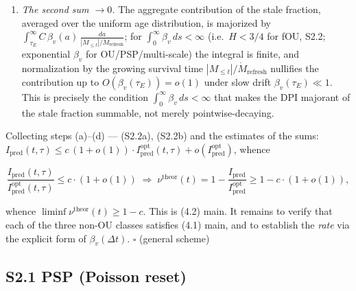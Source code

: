 \documentclass[12pt]{iopart}
\providecommand{\tightlist}{\setlength{\itemsep}{0pt}\setlength{\parskip}{0pt}}
\begin{document}
\begin{enumerate}

\def\labelenumi{(\alph{enumi})}

\setcounter{enumi}{3}

\tightlist

\item

  \emph{The second sum \(\to 0\).} The aggregate contribution of the stale fraction, averaged over the uniform age distribution, is majorized by \(\int_{\tau_E}^\infty C\,\beta_v(a)\,\frac{da}{|M_{\le t}|/\dot M_{\text{refresh}}}\); for \(\int_0^\infty\beta_v\,ds < \infty\) (i.e.~\(H < 3/4\) for fOU, S2.2; exponential \(\beta_v\) for OU/PSP/multi-scale) the integral is finite, and normalization by the growing survival time \(|M_{\le t}|/\dot M_{\text{refresh}}\) nullifies the contribution up to \(O(\beta_v(\tau_E)) = o(1)\) under slow drift \(\beta_v(\tau_E) \ll 1\). This is precisely the condition \(\int_0^\infty\beta_v\,ds < \infty\) that makes the DPI majorant of the stale fraction summable, not merely pointwise-decaying.

\end{enumerate}



Collecting steps (a)--(d) --- (S2.2a), (S2.2b) and the estimates of the sums: \(I_{\text{pred}}(t,\tau) \le c\,(1+o(1))\cdot I_{\text{pred}}^{\text{opt}}(t,\tau) + o(I_{\text{pred}}^{\text{opt}})\), whence



\[\frac{I_{\text{pred}}(t,\tau)}{I_{\text{pred}}^{\text{opt}}(t,\tau)} \le c\cdot(1+o(1)) \;\Longrightarrow\; \nu^{\text{theor}}(t) = 1 - \frac{I_{\text{pred}}}{I_{\text{pred}}^{\text{opt}}} \ge 1 - c\cdot(1+o(1)),\]



whence \(\liminf\nu^{\text{theor}}(t) \ge 1-c\). This is (4.2) main. It remains to verify that each of the three non-OU classes satisfies (4.1) main, and to establish the \emph{rate} via the explicit form of \(\beta_v(\Delta t)\). \(\square\) (general scheme)



\subsection{S2.1 PSP (Poisson reset)}\label{s2.1-psp-poisson-reset}
\end{document}
